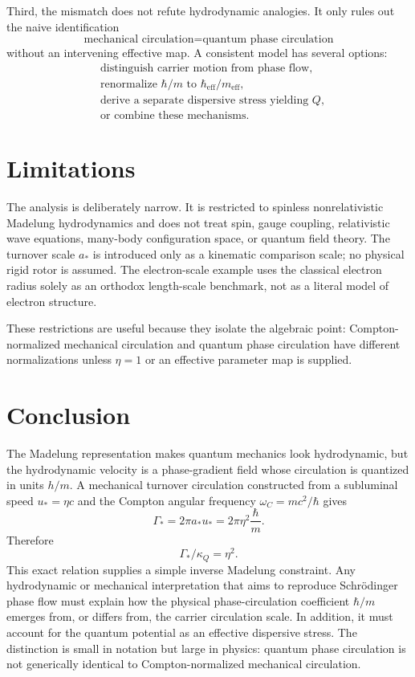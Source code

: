 \documentclass[11pt,a4paper]{article}
\newcommand{\aStar}{a_{*}}
\newcommand{\hbareff}{\hbar_{\mathrm{eff}}}
\newcommand{\meff}{m_{\mathrm{eff}}}
\begin{document}
Third, the mismatch does not refute hydrodynamic analogies. It only rules out the naive identification
\begin{equation}
    \text{mechanical circulation} = \text{quantum phase circulation}
\end{equation}
without an intervening effective map. A consistent model has several options:
\begin{align}
    &\text{distinguish carrier motion from phase flow,}\nonumber\\
    &\text{renormalize }\hbar/m\text{ to }\hbareff/\meff,\nonumber\\
    &\text{derive a separate dispersive stress yielding }Q,\nonumber\\
    &\text{or combine these mechanisms.}\nonumber
\end{align}

\section{Limitations}

The analysis is deliberately narrow. It is restricted to spinless nonrelativistic Madelung hydrodynamics and does not treat spin, gauge coupling, relativistic wave equations, many-body configuration space, or quantum field theory. The turnover scale $\aStar$ is introduced only as a kinematic comparison scale; no physical rigid rotor is assumed. The electron-scale example uses the classical electron radius solely as an orthodox length-scale benchmark, not as a literal model of electron structure.

These restrictions are useful because they isolate the algebraic point: Compton-normalized mechanical circulation and quantum phase circulation have different normalizations unless $\eta=1$ or an effective parameter map is supplied.

\section{Conclusion}

The Madelung representation makes quantum mechanics look hydrodynamic, but the hydrodynamic velocity is a phase-gradient field whose circulation is quantized in units $h/m$. A mechanical turnover circulation constructed from a subluminal speed $u_* = \eta c$ and the Compton angular frequency $\omega_C=mc^2/\hbar$ gives
\begin{equation}
    \Gamma_* = 2\pi a_*u_* = 2\pi\eta^2\frac{\hbar}{m}.
\end{equation}
Therefore
\begin{equation}
    \boxed{\Gamma_*/\kappa_Q=\eta^2.}
\end{equation}
This exact relation supplies a simple inverse Madelung constraint. Any hydrodynamic or mechanical interpretation that aims to reproduce Schr\"odinger phase flow must explain how the physical phase-circulation coefficient $\hbar/m$ emerges from, or differs from, the carrier circulation scale. In addition, it must account for the quantum potential as an effective dispersive stress. The distinction is small in notation but large in physics: quantum phase circulation is not generically identical to Compton-normalized mechanical circulation.
\end{document}
